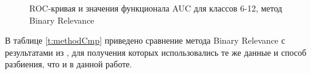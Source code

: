 \documentclass[12pt,twoside]{article}
\begin{document}
\begin{figure}[h]
	\caption{ROC-кривая и значения функционала AUC для классов 6-12, метод Binary Relevance}
	\label{fg:BR2}
\end{figure}

В таблице \ref{t:methodCmp} приведено сравнение метода Binary Relevance с результатами из \cite{qsar}, для получения которых использовались те же данные и способ разбиения, что и в данной работе.
\end{document}
